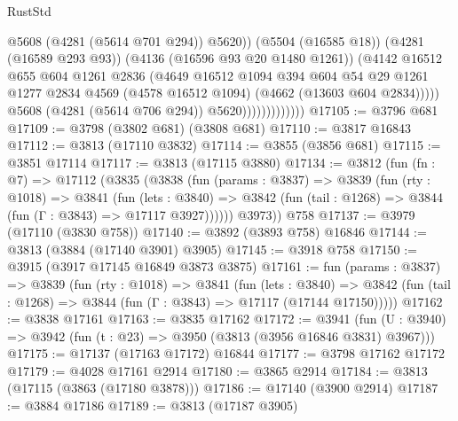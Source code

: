 \begin{lexlean}{RustStd}
\begin{coremodule}
                                    @5608
                                    (@4281 (@5614 @701 @294))
                                    @5620))
                                (@5504 (@16585 @18))
                                (@4281 (@16589 @293 @93))
                                (@4136 (@16596 @93 @20 @1480 @1261))
                                (@4142
                                  @16512
                                  @655
                                  @604
                                  @1261
                                  @2836
                                  (@4649
                                    @16512
                                    @1094
                                    @394
                                    @604
                                    @54
                                    @29
                                    @1261
                                    @1277
                                    @2834
                                    @4569
                                    (@4578 @16512 @1094)
                                    (@4662 (@13603 @604 @2834)))))
                              @5608
                              (@4281 (@5614 @706 @294))
                              @5620)))))))))))))
@17105 := @3796 @681
@17109 := @3798 (@3802 @681) (@3808 @681)
@17110 := @3817 @16843
@17112 := @3813 (@17110 @3832)
@17114 := @3855 (@3856 @681)
@17115 := @3851 @17114
@17117 := @3813 (@17115 @3880)
@17134 := @3812
    (fun (fn : @7) =>
    @17112
      (@3835
        (@3838
          (fun (params : @3837) =>
          @3839
            (fun (rty : @1018) =>
            @3841
              (fun (lets : @3840) =>
              @3842 (fun (tail : @1268) => @3844 (fun (Γ : @3843) => @17117 @3927))))))
        @3973))
    @758
@17137 := @3979 (@17110 (@3830 @758))
@17140 := @3892 (@3893 @758) @16846
@17144 := @3813 (@3884 (@17140 @3901) @3905)
@17145 := @3918 @758
@17150 := @3915 (@3917 @17145 @16849 @3873 @3875)
@17161 := fun (params : @3837) =>
  @3839
    (fun (rty : @1018) =>
    @3841
      (fun (lets : @3840) =>
      @3842 (fun (tail : @1268) => @3844 (fun (Γ : @3843) => @17117 (@17144 @17150)))))
@17162 := @3838 @17161
@17163 := @3835 @17162
@17172 := @3941
    (fun (U : @3940) => @3942 (fun (t : @23) => @3950 (@3813 (@3956 @16846 @3831) @3967)))
@17175 := @17137 (@17163 @17172) @16844
@17177 := @3798 @17162 @17172
@17179 := @4028 @17161 @2914
@17180 := @3865 @2914
@17184 := @3813 (@17115 (@3863 (@17180 @3878)))
@17186 := @17140 (@3900 @2914)
@17187 := @3884 @17186
@17189 := @3813 (@17187 @3905)

\end{coremodule}
\end{lexlean}
